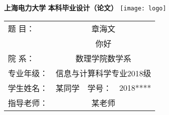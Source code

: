 \thispagestyle{empty}
\begin{center}
{\kaiti{}\bfseries 上海电力大学}
\vskip 50pt
{\STfangsong{}\bfseries 本科毕业设计（论文）}
\vskip 60pt
\texttt{[image: logo]}
\vskip 22pt

{
    \songti
    \def\tabcolsep{1pt}
    \def\arraystretch{1.3}
    \begin{tabular}{lclc}
        题 \quad{} 目：& \multicolumn{3}{c}{
            章海文
        }  \\

        & \multicolumn{3}{c}{
            你好
        }   \\

        院 \quad{} 系：& \multicolumn{3}{c}{
            数理学院数学系
        } \\

        专业年级：& \multicolumn{3}{c}{
            信息与计算科学专业2018级
        } \\

        学生姓名：&\quad{} 某同学 \quad{} & 学号： & 2018****  \\

        指导老师：& \multicolumn{3}{c}{
            某老师
        } \\
    \end{tabular} 
}
\end{center}